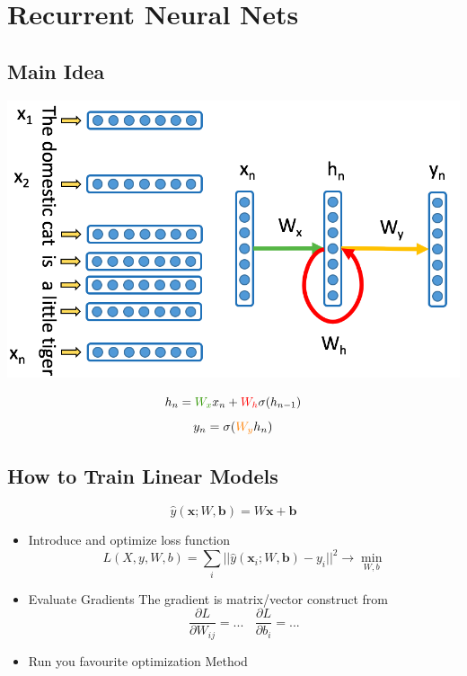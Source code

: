 \documentclass{beamer}
\begin{document}
\begin{frame}
\begin{itemize}
	  \end{itemize}
		
	\end{frame}
	
	\section{Recurrent Neural Nets}
	\subsection*{Main Idea}
	\begin{frame}
		\begin{center}
			\includegraphics[scale=0.35]{img/recurrent_nn}
		\end{center}
		\vspace{-0.5cm}
		$$h_n = \textcolor{green}{W_x} x_n + \textcolor{red}{W_h}\sigma(h_{n-1})$$
		$$y_n = \sigma(\textcolor{notgreen}{W_y}  h_n)$$
		
	\end{frame}
	
	\subsection*{How to Train Linear Models}
	\begin{frame}
		
			{\small$$\hat{y}(\bm{x}; W, \bm{b}) = W\bm{x} + \bm{b}$$}
			\begin{itemize}
				\item Introduce and optimize loss function 
					$$L(X, y, W, b) = \sum_i ||\hat{y}(\bm{x}_i; W, \bm{b}) - y_i||^2 \rightarrow \min_{W, b}$$
				\item Evaluate Gradients
					The gradient is matrix/vector construct from  
					$$\frac{\partial L}{\partial W_{ij}} = ... ~~~~ \frac{\partial L}{\partial b_{i }} = ...  $$
				\item Run you favourite optimization Method
			\end{itemize}
	\end{frame}
	
\end{document}
